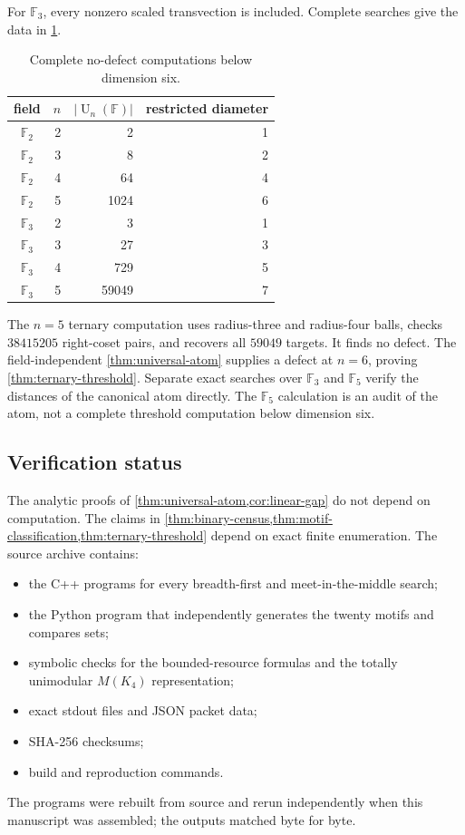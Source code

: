\documentclass[11pt]{amsart}
\numberwithin{equation}{section}
\theoremstyle{definition}
\theoremstyle{remark}
\newcommand{\F}{\mathbb F}
\newcommand{\U}{\operatorname{U}}
\begin{document}
For $\F_3$, every nonzero scaled transvection is included.  Complete searches give the data in \cref{tab:small-fields}.

\begin{table}[t]
\centering
\caption{Complete no-defect computations below dimension six.}
\label{tab:small-fields}
\begin{tabular}{@{}crrr@{}}
\toprule
field & $n$ & $|\U_n(\F)|$ & restricted diameter\\
\midrule
$\F_2$&2&2&1\\
$\F_2$&3&8&2\\
$\F_2$&4&64&4\\
$\F_2$&5&1024&6\\
\addlinespace
$\F_3$&2&3&1\\
$\F_3$&3&27&3\\
$\F_3$&4&729&5\\
$\F_3$&5&59049&7\\
\bottomrule
\end{tabular}
\end{table}

The $n=5$ ternary computation uses radius-three and radius-four balls, checks $38415205$ right-coset pairs, and recovers all $59049$ targets.  It finds no defect.  The field-independent \cref{thm:universal-atom} supplies a defect at $n=6$, proving \cref{thm:ternary-threshold}.  Separate exact searches over $\F_3$ and $\F_5$ verify the distances of the canonical atom directly.  The $\F_5$ calculation is an audit of the atom, not a complete threshold computation below dimension six.

\subsection{Verification status}

The analytic proofs of \cref{thm:universal-atom,cor:linear-gap} do not depend on computation.  The claims in \cref{thm:binary-census,thm:motif-classification,thm:ternary-threshold} depend on exact finite enumeration.  The source archive contains:
\begin{itemize}
\item the C++ programs for every breadth-first and meet-in-the-middle search;
\item the Python program that independently generates the twenty motifs and compares sets;
\item symbolic checks for the bounded-resource formulas and the totally unimodular $M(K_4)$ representation;
\item exact stdout files and JSON packet data;
\item SHA-256 checksums;
\item build and reproduction commands.
\end{itemize}
The programs were rebuilt from source and rerun independently when this manuscript was assembled; the outputs matched byte for byte.
\end{document}
